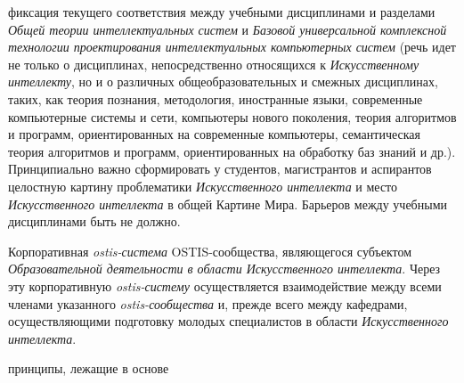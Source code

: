 \begin{scnsubstruct}
\begin{scnindent}
\begin{scnindent}
{\begin{scnitemize}
\begin{scnitemizeii}
		                \item фиксация текущего соответствия между учебными дисциплинами и разделами \textit{Общей теории интеллектуальных систем} и \textit{Базовой универсальной комплексной технологии проектирования интеллектуальных компьютерных систем} (речь идет не только о дисциплинах, непосредственно относящихся к \textit{Искусственному интеллекту}, но и о различных общеобразовательных и смежных дисциплинах, таких, как теория познания, методология, иностранные языки, современные компьютерные системы и сети, компьютеры нового поколения, теория алгоритмов и программ, ориентированных на современные компьютеры, семантическая теория алгоритмов и программ, ориентированных на обработку баз знаний и др.). Принципиально важно сформировать у студентов, магистрантов и аспирантов целостную картину проблематики \textit{Искусственного интеллекта} и место \textit{Искусственного интеллекта} в общей Картине Мира. Барьеров между учебными дисциплинами быть не должно.
		            \end{scnitemizeii}
		            \item Корпоративная \textit{ostis-система} OSTIS-сообщества, являющегося субъектом \textit{Образовательной деятельности в области Искусственного интеллекта}. Через эту корпоративную \textit{ostis-систему} осуществляется взаимодействие между всеми членами указанного \textit{\mbox{ostis-сообщества}} и, прежде всего между кафедрами, осуществляющими подготовку молодых специалистов в области \textit{Искусственного интеллекта}.
		        \end{scnitemize}}
        \end{scnindent}
    \end{scnindent}
    \begin{scnrelfromvector}{принципы, лежащие в основе}
\end{scnrelfromvector}
\end{scnsubstruct}
